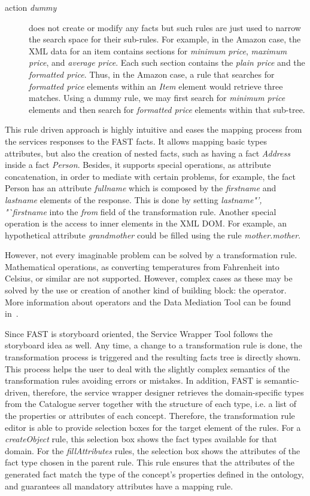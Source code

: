 \documentclass{fast_latex}
\begin{document}
\begin{description}
	\item[action \emph{dummy}] does not create or modify any facts but such rules are just used to narrow the search space for their sub-rules. For example, in the Amazon case, the XML data for an item contains sections for \emph{minimum price}, \emph{maximum price}, and \emph{average price}. Each such section contains the \emph{plain price} and the \emph{formatted price}. Thus, in the Amazon case, a rule that searches for \emph{formatted price} elements within an \emph{Item} element would retrieve three matches. Using a dummy rule, we may first search for \emph{minimum price} elements and then search for \emph{formatted price} elements within that sub-tree.
\end{description}

This rule driven approach is highly intuitive and eases the mapping process from the services responses to the FAST facts.
It allows mapping basic types attributes, but also the creation of nested facts, such as having a fact \emph{Address} inside a fact \emph{Person}. Besides, it supports special operations, as attribute concatenation, in order to mediate with certain problems, for example, the fact Person has an attribute \emph{fullname} which is composed by the \emph{firstname} and \emph{lastname} elements of the response. This is done by setting \emph{lastname"', "`firstname} into the \emph{from} field of the transformation rule. Another special operation is the access to inner elements in the XML DOM. For example, an hypothetical attribute \emph{grandmother} could be filled using the rule \emph{mother.mother}. 

However, not every imaginable problem can be solved by a transformation rule. Mathematical operations, as converting temperatures from Fahrenheit into Celsius, or similar are not supported. However, complex cases as these may be solved by the use or creation of another kind of building block: the operator. More information about operators and the Data Mediation Tool can be found in~\cite{ambrus2011_mediation}.

Since FAST is storyboard oriented, the Service Wrapper Tool follows the storyboard idea as well. Any time, a change to a transformation rule is done, the transformation process is triggered and the resulting facts tree is directly shown. This process helps the user to deal with the slightly complex semantics of the transformation rules avoiding errors or mistakes. In addition, FAST is semantic-driven, therefore, the service wrapper designer retrieves the domain-specific types from the Catalogue server together with the structure of each type, i.e. a list of the properties or attributes of each concept. Therefore, the transformation rule editor is able to provide selection boxes for the target element of the rules. For a \emph{createObject} rule, this selection box shows the fact types available for that domain. For the \emph{fillAttributes} rules, the selection box shows the attributes of the fact type chosen in the parent rule. This rule ensures that the attributes of the generated fact match the type of the concept's properties defined in the ontology, and guarantees all mandatory attributes have a mapping rule.
\end{document}
